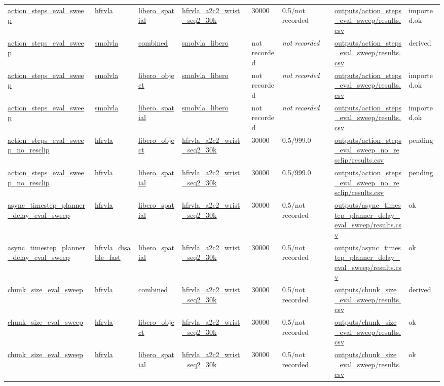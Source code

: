\begin{scriptsize}
\begin{longtable}{@{}p{0.20\linewidth}p{0.10\linewidth}p{0.10\linewidth}p{0.16\linewidth}p{0.07\linewidth}p{0.12\linewidth}p{0.17\linewidth}p{0.08\linewidth}@{}}
\url{action_steps_eval_sweep} & \url{hfrvla} & \url{libero_spatial} & \url{hfrvla_a2c2_wrist_seq2_30k} & 30000 & 0.5/not recorded & \url{outputs/action_steps_eval_sweep/results.csv} & imported,ok \\
\url{action_steps_eval_sweep} & \url{smolvla} & \url{combined} & \url{smolvla_libero} & not recorded & \emph{not recorded} & \url{outputs/action_steps_eval_sweep/results.csv} & derived \\
\url{action_steps_eval_sweep} & \url{smolvla} & \url{libero_object} & \url{smolvla_libero} & not recorded & \emph{not recorded} & \url{outputs/action_steps_eval_sweep/results.csv} & imported,ok \\
\url{action_steps_eval_sweep} & \url{smolvla} & \url{libero_spatial} & \url{smolvla_libero} & not recorded & \emph{not recorded} & \url{outputs/action_steps_eval_sweep/results.csv} & imported,ok \\
\url{action_steps_eval_sweep_no_resclip} & \url{hfrvla} & \url{libero_object} & \url{hfrvla_a2c2_wrist_seq2_30k} & 30000 & 0.5/999.0 & \url{outputs/action_steps_eval_sweep_no_resclip/results.csv} & pending \\
\url{action_steps_eval_sweep_no_resclip} & \url{hfrvla} & \url{libero_spatial} & \url{hfrvla_a2c2_wrist_seq2_30k} & 30000 & 0.5/999.0 & \url{outputs/action_steps_eval_sweep_no_resclip/results.csv} & pending \\
\url{async_timestep_planner_delay_eval_sweep} & \url{hfrvla} & \url{libero_spatial} & \url{hfrvla_a2c2_wrist_seq2_30k} & 30000 & 0.5/not recorded & \url{outputs/async_timestep_planner_delay_eval_sweep/results.csv} & ok \\
\url{async_timestep_planner_delay_eval_sweep} & \url{hfrvla_disable_fast} & \url{libero_spatial} & \url{hfrvla_a2c2_wrist_seq2_30k} & 30000 & 0.5/not recorded & \url{outputs/async_timestep_planner_delay_eval_sweep/results.csv} & ok \\
\url{chunk_size_eval_sweep} & \url{hfrvla} & \url{combined} & \url{hfrvla_a2c2_wrist_seq2_30k} & 30000 & 0.5/not recorded & \url{outputs/chunk_size_eval_sweep/results.csv} & derived \\
\url{chunk_size_eval_sweep} & \url{hfrvla} & \url{libero_object} & \url{hfrvla_a2c2_wrist_seq2_30k} & 30000 & 0.5/not recorded & \url{outputs/chunk_size_eval_sweep/results.csv} & ok \\
\url{chunk_size_eval_sweep} & \url{hfrvla} & \url{libero_spatial} & \url{hfrvla_a2c2_wrist_seq2_30k} & 30000 & 0.5/not recorded & \url{outputs/chunk_size_eval_sweep/results.csv} & ok \\

\end{longtable}
\end{scriptsize}
